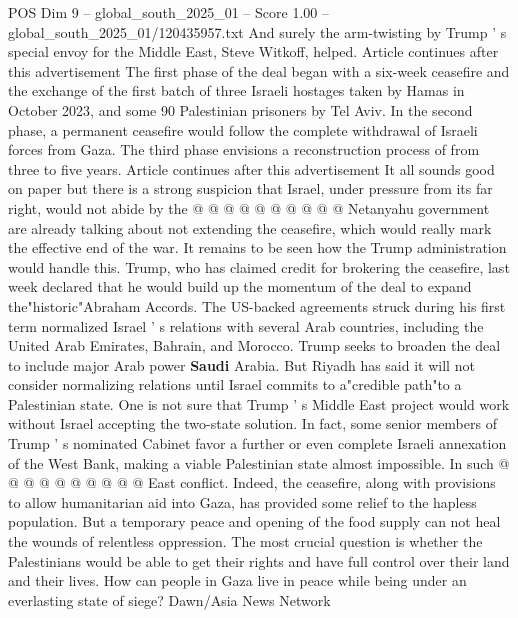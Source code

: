 \begin{textsample}{POS Dim 9 – global\_south\_2025\_01 – Score 1.00 – global\_south\_2025\_01/120435957.txt}
And surely the arm-twisting by Trump ' s special envoy for the Middle East, Steve Witkoff, helped.
Article continues after this advertisement The first phase of the deal began with a six-week ceasefire and the exchange of the first batch of three Israeli hostages taken by Hamas in October 2023, and some 90 Palestinian prisoners by Tel Aviv.
In the second phase, a permanent ceasefire would follow the complete withdrawal of Israeli forces from Gaza.
The third phase envisions a reconstruction process of from three to five years.
Article continues after this advertisement It all sounds good on paper but there is a strong suspicion that Israel, under pressure from its far right, would not abide by the @ @ @ @ @ @ @ @ @ @ Netanyahu government are already talking about not extending the ceasefire, which would really mark the effective end of the war.
It remains to be seen how the Trump administration would handle this.
Trump, who has claimed credit for brokering the ceasefire, last week declared that he would build up the momentum of the deal to expand the"historic"Abraham Accords.
The US-backed agreements struck during his first term normalized Israel ' s relations with several Arab countries, including the United Arab Emirates, Bahrain, and Morocco.
Trump seeks to broaden the deal to include major Arab power \textbf{Saudi} Arabia.
But Riyadh has said it will not consider normalizing relations until Israel commits to a"credible path"to a Palestinian state.
One is not sure that Trump ' s Middle East project would work without Israel accepting the two-state solution.
In fact, some senior members of Trump ' s nominated Cabinet favor a further or even complete Israeli annexation of the West Bank, making a viable Palestinian state almost impossible.
In such @ @ @ @ @ @ @ @ @ @ East conflict.
Indeed, the ceasefire, along with provisions to allow humanitarian aid into Gaza, has provided some relief to the hapless population.
But a temporary peace and opening of the food supply can not heal the wounds of relentless oppression.
The most crucial question is whether the Palestinians would be able to get their rights and have full control over their land and their lives.
How can people in Gaza live in peace while being under an everlasting state of siege?
Dawn/Asia News Network

\end{textsample}
